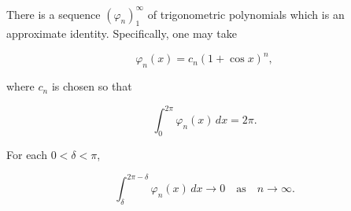 There is a sequence $(\varphi_n)_{1}^{\infty}$ of trigonometric polynomials which is an approximate identity. Specifically, one may take

$$\varphi_n(x) = c_n(1 + \cos x)^n,$$

where $c_n$ is chosen so that

$$\int_0^{2\pi} \varphi_n(x) \, dx = 2\pi.$$

For each $0 < \delta < \pi$,

$$\int_{\delta}^{2\pi - \delta} \varphi_n(x) \, dx \to 0 \quad \text{as} \quad n \to \infty.$$
